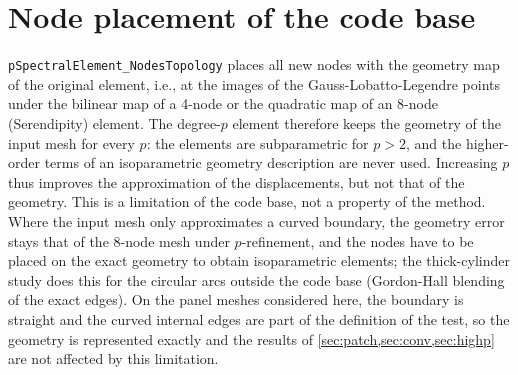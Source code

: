 \documentclass[10pt,a4paper]{article}
\begin{document}
\section{Node placement of the code base}\label{sec:code}
\texttt{pSpectralElement\_NodesTopology} places all new nodes with the geometry map of the
original element, i.e., at the images of the Gauss-Lobatto-Legendre points under the bilinear map of a 4-node or
the quadratic map of an 8-node (Serendipity) element. The degree-$p$ element therefore keeps the
geometry of the input mesh for every $p$: the elements are subparametric for $p>2$, and the
higher-order terms of an isoparametric geometry description are never used. Increasing $p$ thus
improves the approximation of the displacements, but not that of the geometry. This is a
limitation of the code base, not a property of the method. Where the input mesh only
approximates a curved boundary, the geometry error stays that of the 8-node mesh under
$p$-refinement, and the nodes have to be placed on the exact geometry to obtain isoparametric
elements; the thick-cylinder study does this for the circular arcs outside the code base
(Gordon-Hall blending of the exact edges). On the panel meshes considered here, the boundary is
straight and the curved internal edges are part of the definition of the test, so the
geometry is represented exactly and the results of \cref{sec:patch,sec:conv,sec:highp} are not
affected by this limitation.
\end{document}
